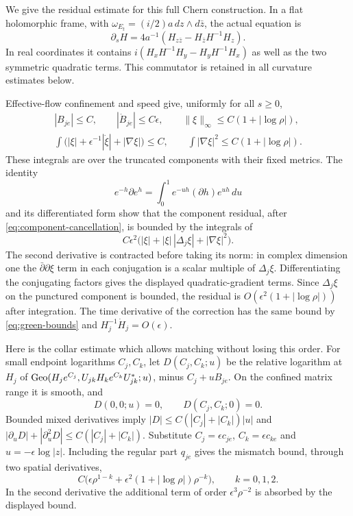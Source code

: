 We give the residual estimate for this full Chern construction.
In a flat holomorphic frame, with
$\omega_{E_t}=(i/2)a\,dz\wedge d\bar z$, the actual equation is
\begin{equation}\label{eq:curve-chern-flow}
 \partial_sH=4a^{-1}(H_{z\bar z}-H_{\bar z}H^{-1}H_z).
\end{equation}
In real coordinates it contains
$i(H_xH^{-1}H_y-H_yH^{-1}H_x)$ as well as the two symmetric quadratic
terms. This commutator is retained in all curvature estimates below.

Effective-flow confinement and speed give, uniformly for all $s\ge0$,
\begin{equation}\label{eq:green-bounds}
 \begin{gathered}
 |B_{je}|\le C,\qquad |\dot B_{je}|\le C\epsilon,\qquad
 \|\xi\|_\infty\le C(1+|\log\rho|),\\
 \int\bigl(|\xi|+\epsilon^{-1}|\dot\xi|+|\nabla\xi|\bigr)\le C,
 \qquad \int|\nabla\xi|^2\le C(1+|\log\rho|).
 \end{gathered}
\end{equation}
These integrals are over the truncated components with their fixed metrics.
The identity
\[
 e^{-h}\partial e^h=\int_0^1e^{-uh}(\partial h)e^{uh}\,du
\]
and its differentiated form show that the component residual, after
\eqref{eq:component-cancellation}, is bounded by the integrals of
\[
 C\epsilon^2\bigl(|\xi|+|\xi|\,|\Delta_j\xi|
                                 +|\nabla\xi|^2\bigr).
\]
The second derivative is contracted before taking its norm: in complex
dimension one the $\bar\partial\partial\xi$ term in each conjugation
is a scalar multiple of $\Delta_j\xi$. Differentiating the conjugating
factors gives the displayed quadratic-gradient terms. Since
$\Delta_j\xi$ on the punctured component is bounded, the residual is
$O(\epsilon^2(1+|\log\rho|))$ after integration.
The time derivative of the correction has the same bound by
\eqref{eq:green-bounds} and $H_j^{-1}\dot H_j=O(\epsilon)$.

Here is the collar estimate which allows matching without losing this
order. For small endpoint logarithms $C_j,C_k$, let $D(C_j,C_k;u)$
be the relative logarithm at $H_j$ of
$\operatorname{Geo}(H_je^{C_j},U_{jk}H_ke^{C_k}U_{jk}^*;u)$, minus
$C_j+uB_{je}$. On the confined matrix range it is smooth, and
\[
 D(0,0;u)=0,\qquad D(C_j,C_k;0)=0.
\]
Bounded mixed derivatives imply
$|D|\le C(|C_j|+|C_k|)|u|$ and
$|\partial_uD|+|\partial_u^2D|\le C(|C_j|+|C_k|)$.
Substitute $C_j=\epsilon c_{je}$, $C_k=\epsilon c_{ke}$ and
$u=-\epsilon\log|z|$. Including the regular part $q_{je}$ gives
the mismatch bound, through two spatial derivatives,
\begin{equation}\label{eq:collar-mismatch}
 C\bigl(\epsilon\rho^{1-k}
             +\epsilon^2(1+|\log\rho|)\rho^{-k}\bigr),
 \qquad k=0,1,2.
\end{equation}
In the second derivative the additional term of order
$\epsilon^3\rho^{-2}$ is absorbed by the displayed bound.

